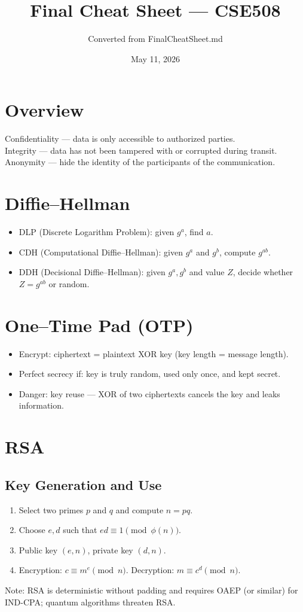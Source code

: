 \documentclass[11pt]{article}
\title{Final Cheat Sheet --- CSE508}
\author{Converted from FinalCheatSheet.md}
\date{May 11, 2026}
\begin{document}
\maketitle
\tableofcontents
\clearpage

\section{Overview}
Confidentiality --- data is only accessible to authorized parties.\\
Integrity --- data has not been tampered with or corrupted during transit.\\
Anonymity --- hide the identity of the participants of the communication.

\section{Diffie--Hellman}
\begin{itemize}
  \item DLP (Discrete Logarithm Problem): given $g^a$, find $a$.
  \item CDH (Computational Diffie--Hellman): given $g^a$ and $g^b$, compute $g^{ab}$.
  \item DDH (Decisional Diffie--Hellman): given $g^a,g^b$ and value $Z$, decide whether $Z=g^{ab}$ or random.
\end{itemize}

\section{One--Time Pad (OTP)}
\begin{itemize}
  \item Encrypt: ciphertext = plaintext XOR key (key length = message length).
  \item Perfect secrecy if: key is truly random, used only once, and kept secret.
  \item Danger: key reuse — XOR of two ciphertexts cancels the key and leaks information.
\end{itemize}

\section{RSA}
\subsection*{Key Generation and Use}
\begin{enumerate}
  \item Select two primes $p$ and $q$ and compute $n=pq$.
  \item Choose $e,d$ such that $ed\equiv1\pmod{\phi(n)}$.
  \item Public key $(e,n)$, private key $(d,n)$.
  \item Encryption: $c\equiv m^e\pmod n$. Decryption: $m\equiv c^d\pmod n$.
\end{enumerate}
\noindent Note: RSA is deterministic without padding and requires OAEP (or similar) for IND-CPA; quantum algorithms threaten RSA.
\end{document}
